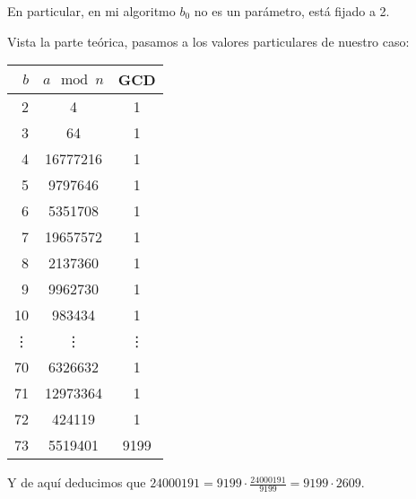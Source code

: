 \begin{enumerate}
		En particular, en mi algoritmo $b_0$ no es un parámetro, está fijado a 2.
		
		Vista la parte teórica, pasamos a los valores particulares de nuestro caso:
		\begin{center}
		\begin{tabular}{ | r | c | c |}
			\hline
			$b$     & $a \mod n$    & GCD \\
			\hline
			2       &  4            &  1  \\
			3       &  64           &  1  \\
			4       &  16777216     &  1  \\
			5       &  9797646      &  1  \\
			6       &  5351708      &  1  \\
			7       &  19657572     &  1  \\
			8       &  2137360      &  1  \\
			9       &  9962730      &  1  \\
			10      &  983434       &  1  \\
			\vdots  &  \vdots       &  \vdots  \\
			70      &  6326632      &  1  \\
			71      &  12973364     &  1  \\
			72      &  424119       &  1  \\
			73      &  5519401      &  9199  \\
			\hline
		\end{tabular}
		\end{center}
		
		Y de aquí deducimos que $\displaystyle 24000191 = 9199 \cdot \frac{24000191}{9199} = 9199 \cdot 2609$.
	\end{enumerate}
